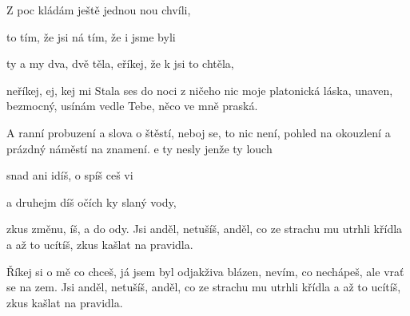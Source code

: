 
   

\zs
Z  poc
kládám ještě jednou nou chvíli,

 to tím, že jsi 
ná tím, že i jsme byli

ty a  my dva, dvě  těla,
eříkej, že k jsi to chtěla,

 neříkej,
ej, kej mi 
\ks
\zs
Stala ses do noci
z ničeho nic moje platonická láska,
unaven, bezmocný,
usínám vedle Tebe, něco ve mně praská.

A ranní probuzení
a slova o štěstí, neboj se, to nic není,
pohled na okouzlení
a prázdný náměstí na znamení.
\ks
\zr
{}e ty nesly
jenže ty louch

snad ani idíš,
o spíš ceš vi

a druhejm díš
 očích ky slaný vody, 

zkus změnu, íš, 
a  do ody.
\kr
\zs
Jsi anděl, netušíš,
anděl, co ze strachu mu utrhli křídla
a až to ucítíš, zkus kašlat na pravidla.

Říkej si o mě co chceš,
já jsem byl odjakživa blázen,
nevím, co nechápeš,
ale vrať se na zem.
\ks
\zr \kr
\zs
Jsi anděl, netušíš,
anděl, co ze strachu mu utrhli křídla
a až to ucítíš, zkus kašlat na pravidla.
\ks
\zr \kr

\kp







